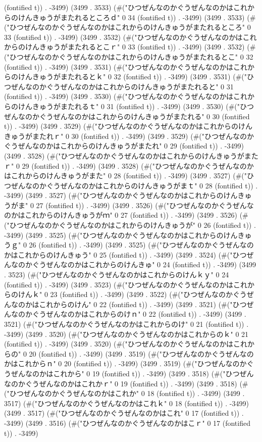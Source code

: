 (fontified t)) . -3499) (3499 . 3533) (#("ひつぜんなのかぐうぜんなのかはこれからのけんきゅうがまたれるところｄ" 0 34 (fontified t)) . -3499) (3499 . 3533) (#("ひつぜんなのかぐうぜんなのかはこれからのけんきゅうがまたれるところ" 0 33 (fontified t)) . -3499) (3499 . 3532) (#("ひつぜんなのかぐうぜんなのかはこれからのけんきゅうがまたれるとこｒ" 0 33 (fontified t)) . -3499) (3499 . 3532) (#("ひつぜんなのかぐうぜんなのかはこれからのけんきゅうがまたれるとこ" 0 32 (fontified t)) . -3499) (3499 . 3531) (#("ひつぜんなのかぐうぜんなのかはこれからのけんきゅうがまたれるとｋ" 0 32 (fontified t)) . -3499) (3499 . 3531) (#("ひつぜんなのかぐうぜんなのかはこれからのけんきゅうがまたれると" 0 31 (fontified t)) . -3499) (3499 . 3530) (#("ひつぜんなのかぐうぜんなのかはこれからのけんきゅうがまたれるｔ" 0 31 (fontified t)) . -3499) (3499 . 3530) (#("ひつぜんなのかぐうぜんなのかはこれからのけんきゅうがまたれる" 0 30 (fontified t)) . -3499) (3499 . 3529) (#("ひつぜんなのかぐうぜんなのかはこれからのけんきゅうがまたれｒ" 0 30 (fontified t)) . -3499) (3499 . 3529) (#("ひつぜんなのかぐうぜんなのかはこれからのけんきゅうがまたれ" 0 29 (fontified t)) . -3499) (3499 . 3528) (#("ひつぜんなのかぐうぜんなのかはこれからのけんきゅうがまたｒ" 0 29 (fontified t)) . -3499) (3499 . 3528) (#("ひつぜんなのかぐうぜんなのかはこれからのけんきゅうがまた" 0 28 (fontified t)) . -3499) (3499 . 3527) (#("ひつぜんなのかぐうぜんなのかはこれからのけんきゅうがまｔ" 0 28 (fontified t)) . -3499) (3499 . 3527) (#("ひつぜんなのかぐうぜんなのかはこれからのけんきゅうがま" 0 27 (fontified t)) . -3499) (3499 . 3526) (#("ひつぜんなのかぐうぜんなのかはこれからのけんきゅうがｍ" 0 27 (fontified t)) . -3499) (3499 . 3526) (#("ひつぜんなのかぐうぜんなのかはこれからのけんきゅうが" 0 26 (fontified t)) . -3499) (3499 . 3525) (#("ひつぜんなのかぐうぜんなのかはこれからのけんきゅうｇ" 0 26 (fontified t)) . -3499) (3499 . 3525) (#("ひつぜんなのかぐうぜんなのかはこれからのけんきゅう" 0 25 (fontified t)) . -3499) (3499 . 3524) (#("ひつぜんなのかぐうぜんなのかはこれからのけんきゅ" 0 24 (fontified t)) . -3499) (3499 . 3523) (#("ひつぜんなのかぐうぜんなのかはこれからのけんｋｙ" 0 24 (fontified t)) . -3499) (3499 . 3523) (#("ひつぜんなのかぐうぜんなのかはこれからのけんｋ" 0 23 (fontified t)) . -3499) (3499 . 3522) (#("ひつぜんなのかぐうぜんなのかはこれからのけん" 0 22 (fontified t)) . -3499) (3499 . 3521) (#("ひつぜんなのかぐうぜんなのかはこれからのけｎ" 0 22 (fontified t)) . -3499) (3499 . 3521) (#("ひつぜんなのかぐうぜんなのかはこれからのけ" 0 21 (fontified t)) . -3499) (3499 . 3520) (#("ひつぜんなのかぐうぜんなのかはこれからのｋ" 0 21 (fontified t)) . -3499) (3499 . 3520) (#("ひつぜんなのかぐうぜんなのかはこれからの" 0 20 (fontified t)) . -3499) (3499 . 3519) (#("ひつぜんなのかぐうぜんなのかはこれからｎ" 0 20 (fontified t)) . -3499) (3499 . 3519) (#("ひつぜんなのかぐうぜんなのかはこれから" 0 19 (fontified t)) . -3499) (3499 . 3518) (#("ひつぜんなのかぐうぜんなのかはこれかｒ" 0 19 (fontified t)) . -3499) (3499 . 3518) (#("ひつぜんなのかぐうぜんなのかはこれか" 0 18 (fontified t)) . -3499) (3499 . 3517) (#("ひつぜんなのかぐうぜんなのかはこれｋ" 0 18 (fontified t)) . -3499) (3499 . 3517) (#("ひつぜんなのかぐうぜんなのかはこれ" 0 17 (fontified t)) . -3499) (3499 . 3516) (#("ひつぜんなのかぐうぜんなのかはこｒ" 0 17 (fontified t)) . -3499) 